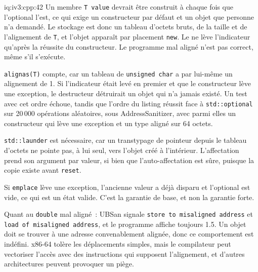\begin{solution}{iq:iv3:cpp:42}
Un membre \texttt{T value} devrait être construit à chaque fois que l'optional l'est, ce qui exige un constructeur par défaut et un objet que personne n'a demandé. Le stockage est donc un tableau d'octets bruts, de la taille et de l'alignement de \texttt{T}, et l'objet apparaît par placement \texttt{new}. Le  ne lève l'indicateur qu'après la réussite du constructeur. Le programme mal aligné n'est pas correct, même s'il s'exécute.
\label{lst:iv3:cp:opt}

\texttt{alignas(T)} compte, car un tableau de \texttt{unsigned char} a par lui-même un alignement de 1. Si l'indicateur était levé en premier et que le constructeur lève une exception, le destructeur détruirait un objet qui n'a jamais existé. Un test avec cet ordre échoue, tandis que l'ordre du listing réussit face à \texttt{std::optional} sur 20\,000 opérations aléatoires, sous AddressSanitizer, avec parmi elles un constructeur qui lève une exception et un type aligné sur 64 octets.

\texttt{std::launder} est nécessaire, car un transtypage de pointeur depuis le tableau d'octets ne pointe pas, à lui seul, vers l'objet créé à l'intérieur. L'affectation prend son argument par valeur, si bien que l'auto-affectation est sûre, puisque la copie existe avant \texttt{reset}.

Si \texttt{emplace} lève une exception, l'ancienne valeur a déjà disparu et l'optional est vide, ce qui est un état valide. C'est la garantie de base, et non la garantie forte.

Quant au \texttt{double} mal aligné~: UBSan signale \texttt{store to misaligned address} et \texttt{load of misaligned address}, et le programme affiche toujours 1.5. Un objet doit se trouver à une adresse convenablement alignée, donc ce comportement est indéfini. x86-64 tolère les déplacements simples, mais le compilateur peut vectoriser l'accès avec des instructions qui supposent l'alignement, et d'autres architectures peuvent provoquer un piège.

\end{solution}

